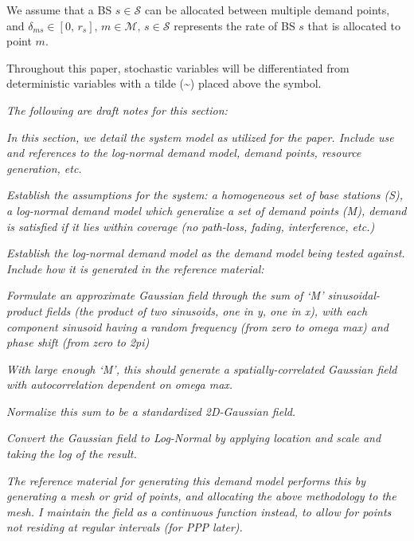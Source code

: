\documentclass[onecolumn,draftcls]{IEEEtran}
\begin{document}

We assume that a BS $s \in \mathcal{S}$ can be allocated between multiple demand points, and $\delta_{ms} \in [0,\, r_s],\, m \in \mathcal{M},\, s \in \mathcal{S}$ represents the rate of BS $s$ that is allocated to point $m$.

Throughout this paper, stochastic variables will be differentiated from deterministic variables with a tilde (\textasciitilde) placed above the symbol.

\iffalse
\noindent {\color{red} \rule{\linewidth}{0.5mm}}

\textit{The following are draft notes for this section:}

\textit{In this section, we detail the system model as utilized for the paper.  Include use and references to the log-normal demand model, demand points, resource generation, etc.}

\textit{Establish the assumptions for the system: a homogeneous set of base stations (S), a log-normal demand model which generalize a set of demand points (M), demand is satisfied if it lies within coverage (no path-loss, fading, interference, etc.)}

\textit{Establish the log-normal demand model as the demand model being tested against.  Include how it is generated in the reference material:}

\textit{Formulate an approximate Gaussian field through the sum of `M' sinusoidal-product fields (the product of two sinusoids, one in y, one in x), with each component sinusoid having a random frequency (from zero to omega max) and phase shift (from zero to 2pi)}
		
\textit{With large enough `M', this should generate a spatially-correlated Gaussian field with autocorrelation dependent on omega max.}
		
\textit{Normalize this sum to be a standardized 2D-Gaussian field.}
		
\textit{Convert the Gaussian field to Log-Normal by applying location and scale and taking the log of the result.}
		
\textit{The reference material for generating this demand model performs this by generating a mesh or grid of points, and allocating the above methodology to the mesh.  I maintain the field as a continuous function instead, to allow for points not residing at regular intervals (for PPP later).}
\end{document}
